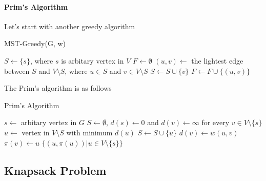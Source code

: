                 \paragraph{Prim's Algorithm}
                    Let's start with another greedy algorithm
                    \begin{algorithm}[H]
                        \caption{MST-Greedy(G, w)}
                        \begin{algorithmic}
                            \State $S \gets \{s\}$, where $s$ is arbitary vertex in $V$
                            \State $F \gets \emptyset$
                                \State $(u, v) \gets$ the lightest edge between $S$ and $V \setminus S$, where $u \in S$ and $v \in V \setminus S$
                                \State $S \gets S \cup \{v\}$
                                \State $F \gets F \cup \{(u, v)\}$
                            \EndWhile
                        \end{algorithmic}
                    \end{algorithm}

                    The Prim's algorithm is as follows
                    \begin{algorithm}[H]
                        \caption{Prim's Algorithm}
                        \begin{algorithmic}
                            \State $s \gets$ arbitary vertex in $G$
                            \State $S \gets \emptyset$, $d(s) \gets 0$ and $d(v) \gets \infty$ for every $v \in V \setminus \{s\}$
                                \State $u \gets $ vertex in $V\setminus S$ with minimum $d(u)$
                                \State $S \gets S \cup \{u\}$
                                        \State $d(v) \gets w(u, v)$
                                        \State $\pi(v) \gets u$
                                    \EndIf
                                \EndFor
                            \EndWhile
                            \State \Return $\{(u, \pi(u))| u \in V \setminus \{s\}\}$
                        \end{algorithmic}
                    \end{algorithm}

            \subsection{Knapsack Problem}
